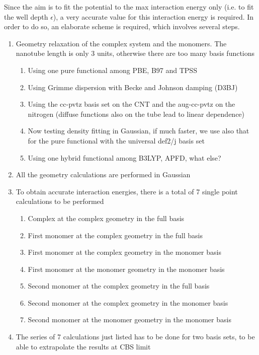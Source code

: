 \documentclass[utf8]{article}
\begin{document}
\clearpage
Since the aim is to fit the potential to the max interaction energy only (i.e. to fit the well depth $\epsilon$), a very accurate value for this interaction energy is required. In order to do so, an elaborate scheme is required, which involves several steps.\\
%
\begin{enumerate}
    \item Geometry relaxation of the complex system and the monomers. The nanotube length is only 3 units, otherwise there are too many basis functions
    \begin{enumerate}
        \item Using one pure functional among PBE, B97 and TPSS
        \item Using Grimme dispersion with Becke and Johnson damping (D3BJ)
        \item Using the cc-pvtz basis set on the CNT and the aug-cc-pvtz on the nitrogen (diffuse functions also on the tube lead to linear dependence)
        \item Now testing density fitting in Gaussian, if much faster, we use also that for the pure functional with the universal def2/j basis set
        \item Using one hybrid functional among B3LYP, APFD, what else?
    \end{enumerate}
    \item All the geometry calculations are performed in Gaussian
    \item To obtain accurate interaction energies, there is a total of 7 single point calculations to be performed
    \begin{enumerate}
        \item Complex at the complex geometry in the full basis
        \item First monomer at the complex geometry in the full basis
        \item First monomer at the complex geometry in the monomer basis
        \item First monomer at the monomer geometry in the monomer basis
        \item Second monomer at the complex geometry in the full basis
        \item Second monomer at the complex geometry in the monomer basis
        \item Second monomer at the monomer geometry in the monomer basis
    \end{enumerate}
    \item The series of 7 calculations just listed has to be done for two basis sets, to be able to extrapolate the results at CBS limit

\end{enumerate}
\end{document}
